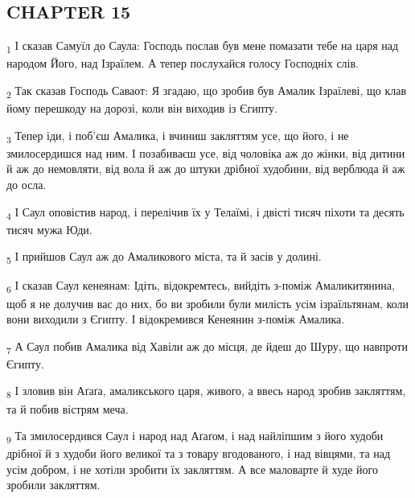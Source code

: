 \subsection{CHAPTER 15}
\begin{tcolorbox}
\textsubscript{1} І сказав Самуїл до Саула: Господь послав був мене помазати тебе на царя над народом Його, над Ізраїлем. А тепер послухайся голосу Господніх слів.
\end{tcolorbox}
\begin{tcolorbox}
\textsubscript{2} Так сказав Господь Саваот: Я згадаю, що зробив був Амалик Ізраїлеві, що клав йому перешкоду на дорозі, коли він виходив із Єгипту.
\end{tcolorbox}
\begin{tcolorbox}
\textsubscript{3} Тепер іди, і поб'єш Амалика, і вчиниш закляттям усе, що його, і не змилосердишся над ним. І позабиваєш усе, від чоловіка аж до жінки, від дитини й аж до немовляти, від вола й аж до штуки дрібної худобини, від верблюда й аж до осла.
\end{tcolorbox}
\begin{tcolorbox}
\textsubscript{4} І Саул оповістив народ, і перелічив їх у Телаїмі, і двісті тисяч піхоти та десять тисяч мужа Юди.
\end{tcolorbox}
\begin{tcolorbox}
\textsubscript{5} І прийшов Саул аж до Амаликового міста, та й засів у долині.
\end{tcolorbox}
\begin{tcolorbox}
\textsubscript{6} І сказав Саул кенеянам: Ідіть, відокремтесь, вийдіть з-поміж Амаликитянина, щоб я не долучив вас до них, бо ви зробили були милість усім ізраїльтянам, коли вони виходили з Єгипту. І відокремився Кенеянин з-поміж Амалика.
\end{tcolorbox}
\begin{tcolorbox}
\textsubscript{7} А Саул побив Амалика від Хавіли аж до місця, де йдеш до Шуру, що навпроти Єгипту.
\end{tcolorbox}
\begin{tcolorbox}
\textsubscript{8} І зловив він Аґаґа, амаликського царя, живого, а ввесь народ зробив закляттям, та й побив вістрям меча.
\end{tcolorbox}
\begin{tcolorbox}
\textsubscript{9} Та змилосердився Саул і народ над Аґаґом, і над найліпшим з його худоби дрібної й з худоби його великої та з товару вгодованого, і над вівцями, та над усім добром, і не хотіли зробити їх закляттям. А все маловарте й худе його зробили закляттям.
\end{tcolorbox}
